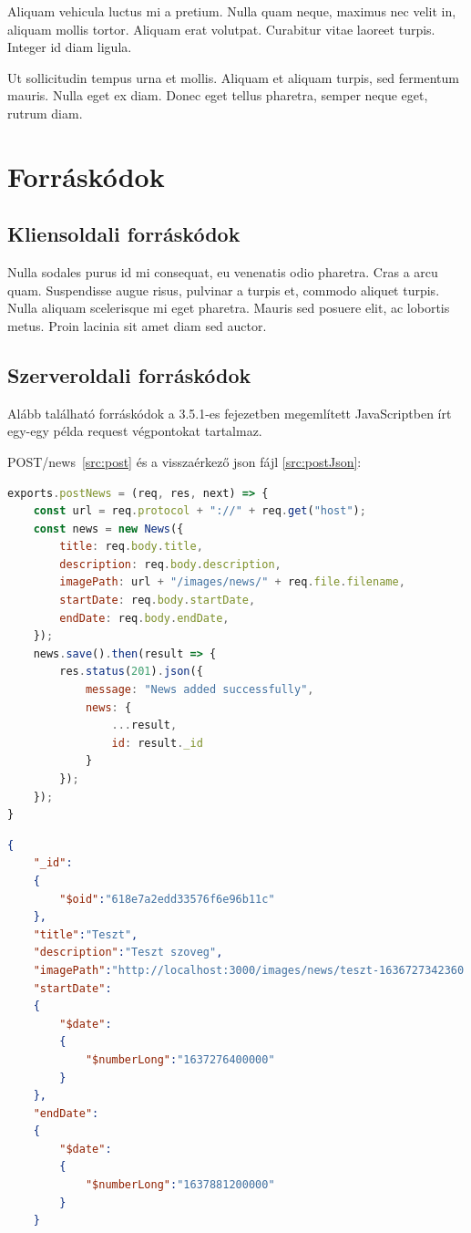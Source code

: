 \begin{note}
Aliquam vehicula luctus mi a pretium. Nulla quam neque, maximus nec velit in, aliquam mollis tortor. Aliquam erat volutpat. Curabitur vitae laoreet turpis. Integer id diam ligula.
\end{note}

Ut sollicitudin tempus urna et mollis. Aliquam et aliquam turpis, sed fermentum mauris. Nulla eget ex diam. Donec eget tellus pharetra, semper neque eget, rutrum diam.


\section{Forráskódok} %

\subsection{Kliensoldali forráskódok}
Nulla sodales purus id mi consequat, eu venenatis odio pharetra. Cras a arcu quam. Suspendisse augue risus, pulvinar a turpis et, commodo aliquet turpis. Nulla aliquam scelerisque mi eget pharetra. Mauris sed posuere elit, ac lobortis metus. Proin lacinia sit amet diam sed auctor.

\subsection{Szerveroldali forráskódok}
Alább található forráskódok a 3.5.1-es fejezetben megemlített JavaScriptben írt egy-egy példa request végpontokat tartalmaz.

POST/news~\ref{src:post} és a visszaérkező json fájl \ref{src:postJson}:

\begin{lstlisting}[language=JavaScript]
exports.postNews = (req, res, next) => {
	const url = req.protocol + "://" + req.get("host");
	const news = new News({
		title: req.body.title,
		description: req.body.description,
		imagePath: url + "/images/news/" + req.file.filename,
		startDate: req.body.startDate,
		endDate: req.body.endDate,
	});
	news.save().then(result => {
		res.status(201).json({
			message: "News added successfully",
			news: {
				...result,
				id: result._id
			}
		});
	});
}
\end{lstlisting}

\begin{lstlisting}[language={JSON}]
{
	"_id":
	{
		"$oid":"618e7a2edd33576f6e96b11c"
	},
	"title":"Teszt",
	"description":"Teszt szoveg",
	"imagePath":"http://localhost:3000/images/news/teszt-1636727342360.jpg",
	"startDate":
	{
		"$date":
		{
			"$numberLong":"1637276400000"
		}
	},
	"endDate":
	{
		"$date":
		{
			"$numberLong":"1637881200000"
		}
	}
\end{lstlisting}

